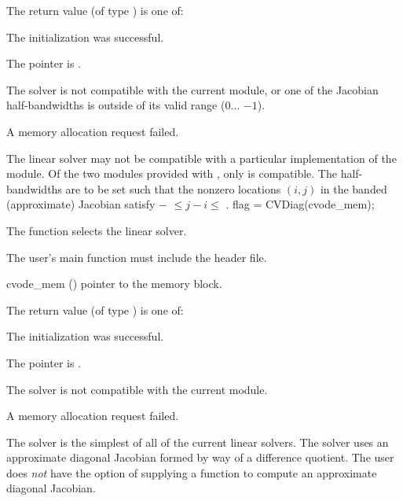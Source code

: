 {
  The return value  (of type ) is one of:
  \begin{args}
  \item[\Id{CVBAND\_SUCCESS}] 
    The {\cvband} initialization was successful.
  \item[\Id{CVBAND\_MEM\_NULL}]
    The  pointer is .
  \item[\Id{CVBAND\_ILL\_INPUT}]
    The {\cvband} solver is not compatible with the current {\nvector} module, or
    one of the Jacobian half-bandwidths is outside of its valid range
    ($0 \ldots$ $-1$).
  \item[\Id{CVBAND\_MEM\_FAIL}]
    A memory allocation request failed.
  \end{args}
}
{
  The {\cvband} linear solver may not be compatible with a particular
  implementation of the {\nvector} module. Of the two {\nvector} modules 
  provided with {\sundials}, only {\nvecs} is compatible.
  The half-bandwidths are to be set such that the nonzero locations $(i,j)$ in the
  banded (approximate) Jacobian satisfy $-$ $\leq j-i \leq$ .
}
{
  flag = CVDiag(cvode\_mem);
}
{
  The function  selects the {\cvdiag} linear solver. 

  The user's main function must include the  header file.
}
{
  \begin{args}
  \item[cvode\_mem] ()
    pointer to the {\cvodes} memory block.
  \end{args}
}
{
  The return value  (of type ) is one of:
  \begin{args}
  \item[\Id{CVDIAG\_SUCCESS}]
    The {\cvdiag} initialization was successful.
  \item[\Id{CVDIAG\_MEM\_NULL}]
    The  pointer is .
  \item[\Id{CVDIAG\_ILL\_INPUT}]
    The {\cvdiag} solver is not compatible with the current {\nvector} module.
  \item[\Id{CVDIAG\_MEM\_FAIL}]
    A memory allocation request failed.
  \end{args}
}
{
  The {\cvdiag} solver is the simplest of all of the current {\cvodes} linear solvers. 
  The {\cvdiag} solver uses an approximate diagonal Jacobian formed by way of a
  difference quotient. The user does {\em not} have the option of supplying a
  function to compute an approximate diagonal Jacobian.
}
